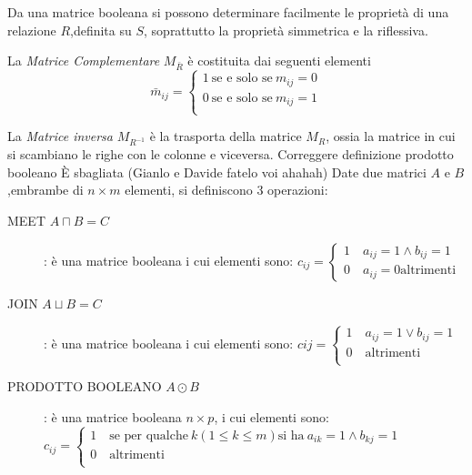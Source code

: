 
Da una matrice booleana si possono determinare facilmente le proprietà
di una relazione $R$,definita su $S$, soprattutto la proprietà simmetrica e la riflessiva.

La \emph{Matrice Complementare} $M_{\bar{R}}$ è costituita dai seguenti elementi
\begin{equation*}
    \bar{m}_{ij} = \begin{cases} 1 \ \text{se e solo se} \ m_{ij} = 0 \\
                                 0 \ \text{se e solo se} \ m_{ij} = 1 \\
                   \end{cases}
\end{equation*}

La \emph{Matrice inversa} $M_{R ^{-1}}$ è la trasporta della matrice $M_R$, ossia la matrice
in cui si scambiano le righe con le colonne e viceversa.
Correggere definizione prodotto booleano
È sbagliata (Gianlo e  Davide fatelo voi ahahah)
Date due matrici $A$ e $B$,embrambe di $n \times m$ elementi, si definiscono 3 operazioni:
\begin{description}
    \item[MEET $A \sqcap B = C$]: è una matrice booleana i cui elementi sono:\newline
$c_{ij} =  \begin{cases} 1 \quad a_{ij} = 1 \land b_{ij} = 1 \\ 0 \quad a_{ij} = 0 \text{altrimenti} \end{cases}$
    \item[JOIN $A \sqcup B = C$]: è una matrice booleana i cui elementi sono:\newline
    $c{ij} = \begin{cases} 1 \quad a_{ij} = 1 \lor b_{ij} = 1 \\
                           0 \quad \text{altrimenti}\\ \end{cases}$
    \item[PRODOTTO BOOLEANO $A \odot B$]: è una matrice booleana $n \times p$, i cui elementi sono:\newline
    $c_{ij} = \begin{cases} 1 \quad \text{se per qualche} \ k(1 \leq k \leq m) \text{si ha} \ a_{ik} = 1 \land b_{kj} = 1\\
                            0 \quad \text{altrimenti} \\ \end{cases}$
\end{description}




